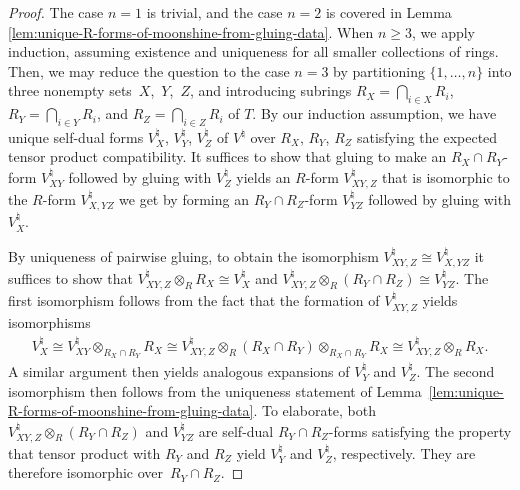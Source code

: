 \documentclass[pdftex]{sigma}
\theoremstyle{definition}
\begin{document}
\begin{proof}
The case $n=1$ is trivial, and the case $n=2$ is covered in Lemma \ref{lem:unique-R-forms-of-moonshine-from-gluing-data}. When $n \geq 3$, we apply induction, assuming existence and uniqueness for all smaller collections of rings. Then, we may reduce the question to the case $n=3$ by partitioning $\{1,\ldots,n\}$ into three nonempty sets~$X$,~$Y$,~$Z$, and introducing subrings $R_X = \bigcap_{i \in X} R_i$, $R_Y = \bigcap_{i \in Y} R_i$, and $R_Z = \bigcap_{i \in Z} R_i$ of $T$. By our induction assumption, we have unique self-dual forms $V^\natural_X$, $V^\natural_Y$, $V^\natural_Z$ of $V^\natural$ over $R_X$, $R_Y$, $R_Z$ satisfying the expected tensor product compatibility. It suffices to show that gluing to make an $R_X \cap R_Y$-form $V^\natural_{XY}$ followed by gluing with $V^\natural_Z$ yields an $R$-form $V^\natural_{XY,Z}$ that is isomorphic to the $R$-form $V^\natural_{X,YZ}$ we get by forming an $R_Y \cap R_Z$-form $V^\natural_{YZ}$ followed by gluing with $V^\natural_X$.

By uniqueness of pairwise gluing, to obtain the isomorphism $V^\natural_{XY,Z} \cong V^\natural_{X,YZ}$ it suffices to show that $V^\natural_{XY,Z} \otimes_{R} R_X \cong V^\natural_X$ and $V^\natural_{XY,Z} \otimes_{R} (R_Y \cap R_Z) \cong V^\natural_{YZ}$. The first isomorphism follows from the fact that the formation of $V^\natural_{XY,Z}$ yields isomorphisms
\begin{gather*}
V^\natural_X \cong V^\natural_{XY} \otimes_{R_X \cap R_Y} R_X \cong V^\natural_{XY,Z} \otimes_{R} (R_X \cap R_Y) \otimes_{R_X \cap R_Y} R_X \cong V^\natural_{XY,Z} \otimes_{R} R_X.
\end{gather*}
A similar argument then yields analogous expansions of $V^\natural_Y$ and $V^\natural_Z$. The second isomorphism then follows from the uniqueness statement of Lemma~\ref{lem:unique-R-forms-of-moonshine-from-gluing-data}. To elaborate, both $V^\natural_{XY,Z} \otimes_{R} (R_Y \cap R_Z)$ and $V^\natural_{YZ}$ are self-dual $R_Y \cap R_Z$-forms satisfying the property that tensor product with $R_Y$ and $R_Z$ yield $V^\natural_Y$ and $V^\natural_Z$, respectively. They are therefore isomorphic over~$R_Y \cap R_Z$.
\end{proof}
\end{document}
